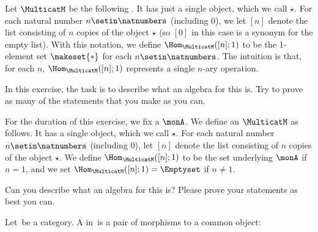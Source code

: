 

\begin{gradedexercise}
    \label{ex:MonoidsAsAlgebras}
    Let $\MulticatM$ be the following .
    It has just a single object, which we call $\star$.
    For each natural number $n \setin \natnumbers$ (including $0$), we let $[n]$ denote the list consisting of $n$ copies of the object $\star$ (so $[0]$ in this case is a synonym for the empty list).
    With this notation, we define $\Hom_\MulticatM([n];1)$ to be the 1-element set $\makeset{ * }$ for each $n \setin \natnumbers$.
    The intuition is that, for each $n$, $\Hom_\MulticatM([n];1)$ represents a single $n$-ary operation.

    In this exercise, the task is to describe what an algebra for this  is.
    Try to prove as many of the statements that you make as you can.
\end{gradedexercise}



\begin{gradedexercise}
    \label{ex:MonoidsActionsAsAlgebras}
    For the duration of this exercise, we fix a  $\monA$.
    We define an $\MulticatM$ as follows.
    It has a single object, which we call $\star$.
    For each natural number $n \setin \natnumbers$ (including $0$), let $[n]$ denote the list consisting of $n$ copies of the object $\star$.
    We define $\Hom_\MulticatM([n];1)$ to be the set underlying $\monA$ if $n =1$, and we set $\Hom_\MulticatM([n];1) = \Emptyset$ if $n \neq 1$.

    Can you describe what an algebra for this  is?
    Please prove your statements as best you can.
\end{gradedexercise}



    \begin{definition}
        \label{def:cospan}
        Let~\CatC be a category.
        A  in~\CatC is a pair of morphisms to a common object:
    \end{definition}

